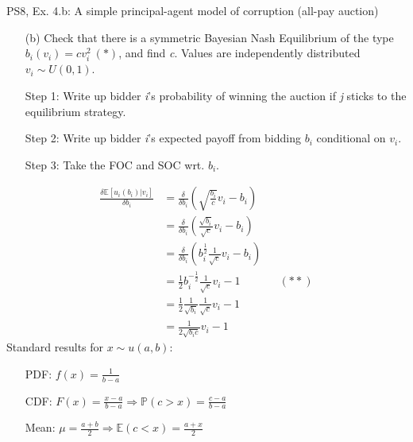 \begin{frame}{PS8, Ex. 4.b: A simple principal-agent model of corruption (all-pay auction)}
    \begin{itemize}
      \item[(b)] Check that there is a symmetric Bayesian Nash Equilibrium of the type $b_i(v_i) = cv_i^2\ (*)$, and find \textit{c}. Values are independently distributed $v_i\sim U(0, 1)$.
    \end{itemize} \vspace{-8pt}
    \begin{multicols}{2}
      \begin{itemize}
        \item[Step 1:] Write up bidder \textit{i}'s probability of winning the auction if \textit{j} sticks to the equilibrium strategy.
        \item[Step 2:] Write up bidder \textit{i}'s expected payoff from bidding $b_i$ conditional on $v_i$.
        \item[Step 3:] Take the FOC and SOC wrt. $b_i$.
      \end{itemize} \vspace{-8pt}
      \begin{align*}
        \frac{\delta\mathbb{E}[u_i(b_i)|v_i]}{\delta b_i}
          &=\frac{\delta}{\delta b_i}\left(\sqrt{\frac{b_i}{c}}v_i-b_i\right)\\
          &=\frac{\delta}{\delta b_i}\left(\frac{\sqrt{b_i}}{\sqrt{c}}v_i-b_i\right)\\
          &=\frac{\delta}{\delta b_i}\left(b_i^{\frac{1}{2}}\frac{1}{\sqrt{c}}v_i-b_i\right)\\
          &=\frac{1}{2}b_i^{-\frac{1}{2}}\frac{1}{\sqrt{c}}v_i-1&&(**)\\
          &=\frac{1}{2}\frac{1}{\sqrt{b_i}}\frac{1}{\sqrt{c}}v_i-1\\
          &=\frac{1}{2\sqrt{b_ic}}v_i-1
      \end{align*}
      \vfill\null\columnbreak
      Standard results for $x\sim u(a, b):$ \vspace{-6pt}
      \begin{itemize}
        \item[PDF:] $f(x)=\frac{1}{b-a}$
        \item[CDF:] $F(x)=\frac{x-a}{b-a}\Rightarrow\mathbb{P}(c>x)=\frac{c-a}{b-a}$
        \item[Mean:] $\mu=\frac{a+b}{2}\Rightarrow\mathbb{E}(c<x)=\frac{a+x}{2}$
      \end{itemize}
      \vspace{-6pt}

\end{multicols}
\end{frame}
